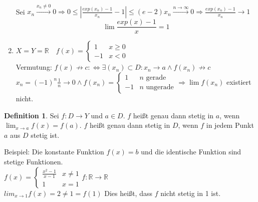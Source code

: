 \documentclass[ngerman,titlepage,twoside, parskip=half*]{scrreprt}
\newcommand*{\R}{\mathbb{R}}
\newcommand*{\perdef}{:\Leftrightarrow}
\theoremstyle{plain}
\theoremstyle{definition}
\newtheorem{definition}{Definition}
\theoremstyle{remark}
\begin{document}
\begin{enumerate}[(1)]
\begin{align*}
    \end{align*}
    Sei $x_n\stackrel{x_n\neq 0}{\rightarrow} 0 \Rightarrow 0\leq |\frac{exp(x_n)-1}{x_n}-1|\leq (e-2)x_n
    \stackrel{n\rightarrow \infty}{\rightarrow} 0 \Rightarrow \frac{exp(x_n)-1}{x_n}\rightarrow 1$
    \[\lim \frac{exp(x)-1}{x}=1\]
  \item $X=Y=\R \quad f(x)=\begin{cases}1 & x \geq 0\\-1 & x<0\end{cases}$\\
    Vermutung: $f(x)\not\rightarrow c \perdef \exists (x_n) \subset D\colon x_n\rightarrow a \wedge f(x_n)\not\rightarrow c$\\
    $x_n=(-1)^n\frac{1}{n}\rightarrow 0 \wedge f(x_n)=\begin{cases}1 & n \text{ gerade}\\-1 & n \text{ ungerade}\end{cases}
    \Rightarrow \lim f(x_n)$ existiert nicht.
\end{enumerate}

\begin{definition}
Sei $f\colon D\rightarrow Y$ und $a \in D$. $f$ heißt genau dann stetig in $a$, wenn $\lim_{x\rightarrow a} 
f(x)=f(a)$. $f$ heißt genau dann stetig in $D$, wenn $f$ in jedem Punkt $a$ aus $D$ stetig ist.
\end{definition}
Beispiel: Die konstante Funktion $f(x)=b$ und die identische Funktion sind stetige Funktionen.\\
$f(x)=\begin{cases}\frac{x^2-1}{x-1} & x \neq 1\\1 & x=1\end{cases} f\colon\R\rightarrow \R$\\
$lim_{x\rightarrow 1}f(x)=2\neq 1=f(1)$ Dies heißt, dass $f$ nicht stetig in 1 ist.
\end{document}
